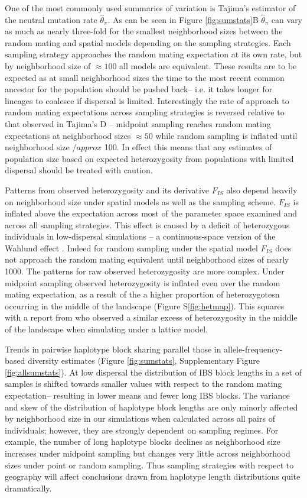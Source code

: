 \documentclass[11pt,twoside,lineno]{preprint}
\begin{document}
One of the most commonly used summaries of variation is Tajima's estimator of the neutral mutation rate $\widehat{\theta}_{\pi}$. As can be seen in Figure \ref{fig:sumstats}B $\widehat{\theta}_{\pi}$ can vary as much as nearly three-fold for the smallest neighborhood sizes between the random mating and spatial models depending on the sampling strategies. Each sampling strategy approaches the random mating expectation at its own rate, but by neighborhood size of $\approx 100$ all models are equivalent. These results are to be expected as at small neighborhood sizes the time to the most recent common ancestor for the population should be pushed back-- i.e. it takes longer for lineages to coalesce if dispersal is limited. Interestingly the rate of approach to random mating expectations across sampling strategies is reversed relative to that observed in Tajima's D -- midpoint sampling reaches random mating expectations at neighborhood sizes $\approx50$ while random sampling is inflated until neighborhood size $/approx$ 100. In effect this means that any estimates of population size based on expected heterozygosity from populations with limited dispersal should be treated with caution. 

Patterns from observed heterozygosity and its derivative $F_{IS}$ also depend heavily on neighborhood size under spatial models as well as the sampling scheme. $F_{IS}$ is inflated above the expectation across most of the parameter space examined and across all sampling strategies. This effect is caused by a deficit of heterozygous individuals in low-dispersal simulations -- a continuous-space version of the Wahlund effect \citep{Wahlund1928}. Indeed for random sampling under the spatial model $F_{IS}$ does not approach the random mating equivalent until neighborhood sizes of nearly 1000. The patterns for raw observed heterozygosity are more complex. Under midpoint sampling observed heterozygosity is inflated even over the random mating expectation, as a result of the a higher proportion of heterozygotesn occurring in the middle of the landscape (Figure S\ref{fig:hetmap}). This squares with a report from \cite{Shirk2014} who observed a similar excess of heterozygosity in the middle of the landscape when simulating under a lattice model.

Trends in pairwise haplotype block sharing parallel those in allele-frequency-based diversity estimates (Figure \ref{fig:sumstats}, Supplementary Figure \ref{fig:allsumstats}). At low dispersal the distribution of IBS block lengths in a set of samples is shifted towards smaller values with respect to the random mating expectation-- resulting in lower means and fewer long IBS blocks. The variance and skew of the distribution of haplotype block lengths are only minorly affected by neighborhood size in our simulations when calculated across all pairs of individuals; however, they are strongly dependent on sampling regimes. For example, the number of long haplotype blocks declines as neighborhood size increases under midpoint sampling but changes very little across neighborhood sizes under point or random sampling. Thus sampling strategies with respect to geography will affect conclusions drawn from haplotype length distributions quite dramatically. 
\end{document}
